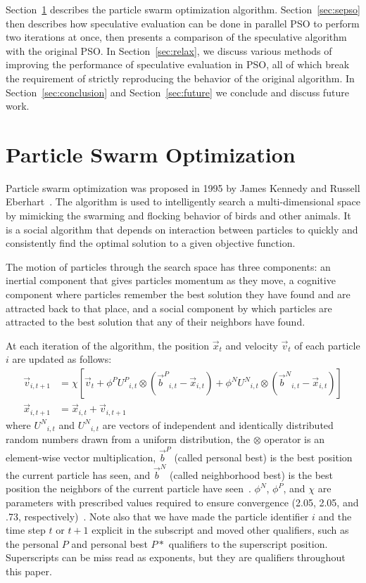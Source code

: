 \documentclass[journal,letterpaper]{IEEEtran}
\renewcommand{\sec}[1]{Section~\ref{sec:#1}}
\providecommand{\pers}{\ensuremath{P}}
\providecommand{\neigh}{\ensuremath{N}}
\providecommand{\nURand}{\ensuremath{U^\neigh}}
\providecommand{\pURand}{\ensuremath{U^\pers}}
\providecommand{\ppos}{\ensuremath{\Vec{x}}}
\providecommand{\pvel}{\ensuremath{\Vec{v}}}
\providecommand{\nbest}{\ensuremath{\Vec{b}^\neigh}}
\providecommand{\pbest}{\ensuremath{\Vec{b}^\pers}}
\providecommand{\constriction}{\ensuremath{\chi}}
\providecommand{\ncoeff}{\ensuremath{\phi^\neigh}}
\providecommand{\pcoeff}{\ensuremath{\phi^\pers}}
\begin{document}
\sec{pso} describes the particle swarm optimization algorithm.  \sec{sepso}
then describes how speculative evaluation can be done in parallel PSO to
perform two iterations at once, then presents a comparison of the speculative
algorithm with the original PSO.  In \sec{relax}, we discuss various methods of
improving the performance of speculative evaluation in PSO, all of which break
the requirement of strictly reproducing the behavior of the original algorithm.
In \sec{conclusion} and \sec{future} we conclude and discuss future work.

\section{Particle Swarm Optimization}
\label{sec:pso}

Particle swarm optimization was proposed in 1995 by James Kennedy and Russell
Eberhart~\cite{kennedy-icnn95}.  The algorithm is used to intelligently search
a multi-dimensional space by mimicking the swarming and flocking behavior of
birds and other animals. It is a social algorithm that depends on interaction
between particles to quickly and consistently find the optimal solution to a
given objective function.

The motion of particles through the search space has three components: an
inertial component that gives particles momentum as they move, a cognitive
component where particles remember the best solution they have found and are
attracted back to that place, and a social component by which particles are
attracted to the best solution that any of their neighbors have found.

At each iteration of the algorithm, the position $\ppos_t$ and velocity
$\pvel_t$ of each particle $i$ are updated as follows:
\begin{align}
\label{eq:velupdate}
	\pvel_{i,t+1} &=
		\constriction \left[ \pvel_t +
			\pcoeff\pURand_{i,t}\otimes(\pbest_{i,t} - \ppos_{i,t}) +
			\ncoeff\nURand_{i,t}\otimes(\nbest_{i,t} - \ppos_{i,t})
		\right] \\
\label{eq:posupdate}
	\ppos_{i,t+1} &= \ppos_{i,t} + \pvel_{i,t+1}
\end{align}
where \( \nURand_{i,t} \) and \( \nURand_{i,t} \) are vectors of independent
and identically distributed random numbers drawn from a uniform
distribution, the \( \otimes \) operator is an element-wise vector
multiplication, $\pbest$ (called personal best) is the best position the
current particle has seen, and $\nbest$ (called neighborhood best) is the best
position the neighbors of the current particle have seen~\cite{bratton-sis07}.  \( \ncoeff \), \(
\pcoeff \), and \( \constriction \) are parameters with prescribed values
required to ensure convergence (2.05, 2.05, and .73,
respectively)~\cite{clerc-tec02}. Note also that we have made the particle identifier $i$
and the time step $t$ or $t+1$ explicit in the subscript and moved other qualifiers,
such as the personal $\pers$ and personal best $\pers*$ qualifiers to the superscript position.
Superscripts can be miss read as exponents, but they are qualifiers throughout this paper.
\end{document}
